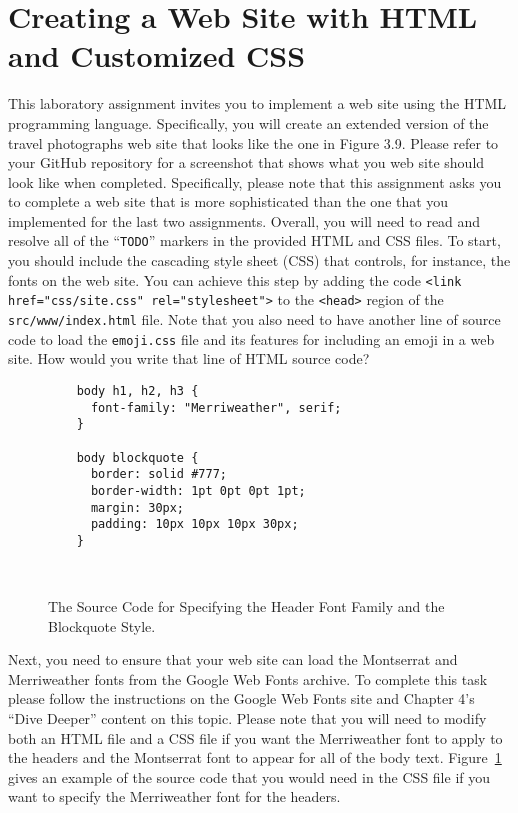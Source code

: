 \documentclass[11pt]{article}
\newcommand{\mainprogramsource}{\lstinline{src/www/index.html}}
\newcommand{\command}[1]{``\lstinline{#1}''}
\newcommand{\program}[1]{\lstinline{#1}}
\begin{document}
\section*{Creating a Web Site with HTML and Customized CSS}

This laboratory assignment invites you to implement a web site using the HTML
programming language. Specifically, you will create an extended version of the
travel photographs web site that looks like the one in Figure 3.9. Please refer
to your GitHub repository for a screenshot that shows what you web site should
look like when completed. Specifically, please note that this assignment asks
you to complete a web site that is more sophisticated than the one that you
implemented for the last two assignments. Overall, you will need to read and
resolve all of the \command{TODO} markers in the provided HTML and CSS files. To
start, you should include the cascading style sheet (CSS) that controls, for
instance, the fonts on the web site. You can achieve this step by adding the
code \program{<link href="css/site.css" rel="stylesheet">} to the
\program{<head>} region of the \mainprogramsource{} file. Note that you also
need to have another line of source code to load the \program{emoji.css} file
and its features for including an emoji in a web site. How would you write that
line of HTML source code?

\begin{figure}[t]
  \centering
  \begin{verbatim}
    body h1, h2, h3 {
      font-family: "Merriweather", serif;
    }

    body blockquote {
      border: solid #777;
      border-width: 1pt 0pt 0pt 1pt;
      margin: 30px;
      padding: 10px 10px 10px 30px;
    }
  \end{verbatim}
  \vspace*{-.35in}
  \caption{The Source Code for Specifying the Header Font Family and the
  Blockquote Style.}~\label{fig:css}
  \vspace*{-.25in}
\end{figure}

Next, you need to ensure that your web site can load the Montserrat and
Merriweather fonts from the Google Web Fonts archive. To complete this task
please follow the instructions on the Google Web Fonts site and Chapter 4's
``Dive Deeper'' content on this topic. Please note that you will need to modify
both an HTML file and a CSS file if you want the Merriweather font to apply to
the headers and the Montserrat font to appear for all of the body text.
Figure~\ref{fig:css} gives an example of the source code that you would need in
the CSS file if you want to specify the Merriweather font for the headers.
\end{document}

